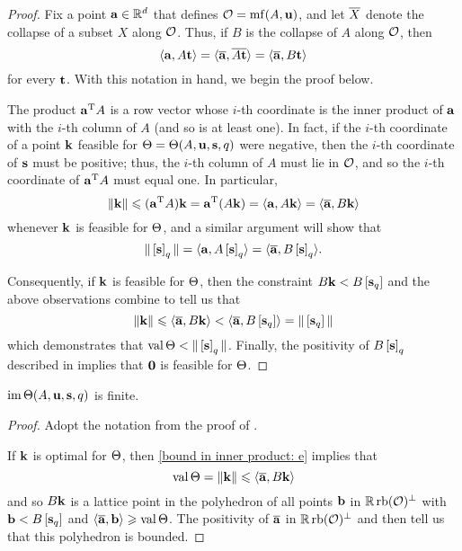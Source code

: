 \documentclass[11pt]{amsart}
\begin{document}
\begin{proof}   
Fix a point $\mathbf{a} \in \mathbb{R}^d$ that defines $\mathcal{O}  = \operatorname{mf}(A, \mathbf{u})$, and let $\overline{X}$ denote the collapse of a subset $X$ along $\mathcal{O}$.  Thus, if $B$ is the collapse of $A$ along $\mathcal{O}$, then
\[ \langle {\mathbf{a}}, A \mathbf{t} \rangle = \langle \overline{\mathbf{a}}, \overline{A \mathbf{t}} \rangle = \langle \overline{\mathbf{a}}, B \mathbf{t} \rangle \] for every $\mathbf{t}$.  With this notation in hand, we begin the proof below.

The product $\mathbf{a}^{\mathrm{T}} A $ is a row vector whose $i$-th coordinate is the inner product of $\mathbf{a}$ with the $i$-th column of $A$ (and so is at least one).   In fact, if the $i$-th coordinate of a point $\mathbf{k}$ feasible for $\Theta = \Theta(A, \mathbf{u}, \mathbf{s}, q)$ were negative, then the $i$-th coordinate of $\mathbf{s}$ must be positive;  thus, the $i$-th column of $A$ must lie in $\mathcal{O}$, and so the $i$-th coordinate of $\mathbf{a}^{\mathrm{T}} A$ must equal one.  In particular, 
%
\begin{equation} 
\label{bound in inner product: e}
\| \mathbf{k} \| \leqslant (\mathbf{a}^{\mathrm{T}} A) \mathbf{k} =  \mathbf{a}^{\mathrm{T}} (A \mathbf{k}) = \langle \mathbf{a}, A \mathbf{k} \rangle = \langle \overline{\mathbf{a}}, B \mathbf{k} \rangle 
\end{equation}
whenever $\mathbf{k}$ is feasible for $\Theta$, and a similar argument will show that 
\begin{equation}  
\label{norm of tail: e}
\| \left[ \mathbf{s} \right]_q \| =  \langle \mathbf{a}, A \left[ \mathbf{s} \right]_q \rangle = \langle \overline{\mathbf{a}}, B \left[ \mathbf{s} \right]_q \rangle.
\end{equation}

Consequently, if $\mathbf{k}$ is feasible for $\Theta$, then the constraint $B\mathbf{k} <B \left[ \mathbf{s}_q \right]$ and the above observations combine to tell us that \[ \| \mathbf{k} \| \leqslant \langle \overline{\mathbf{a}}, B \mathbf{k} \rangle < \langle \overline{\mathbf{a}}, B \left[ \mathbf{s}_q \right] \rangle = \| \left[ \mathbf{s}_q \right] \|\] 
which demonstrates that $\operatorname{val} \Theta < \| \left[ \mathbf{s} \right]_q \|$.  Finally, the positivity of $B\left[ \mathbf{s} \right]_q$ described in  implies that $\mathbf{0}$ is feasible for $\Theta$.
\end{proof}


\begin{corollary}
\label{finite image: C}
$\operatorname{im} \Theta(A, \mathbf{u}, \mathbf{s}, q)$ is finite.
\end{corollary}

\begin{proof}  Adopt the notation from the proof of .

If $\mathbf{k}$ is optimal for $\Theta$, then \eqref{bound in inner product: e} implies that \[ \operatorname{val} \Theta = \| \mathbf{k} \| \leqslant \langle \overline{\mathbf{a}}, B \mathbf{k} \rangle\] and so $B \mathbf{k}$ is a lattice point in the polyhedron of all points $\mathbf{b}$  in $\mathbb{R} \operatorname{rb}(\mathcal{O})^{\perp}$ with $\mathbf{b} < B \left[ \mathbf{s}_q \right]$  and $\langle \overline{\mathbf{a}}, \mathbf{b} \rangle \geqslant \operatorname{val} \Theta$.  The positivity of $\overline{\mathbf{a}}$ in $\mathbb{R} \operatorname{rb}(\mathcal{O})^{\perp}$ and  then tell us  that this polyhedron is bounded.  
\end{proof}
\end{document}
